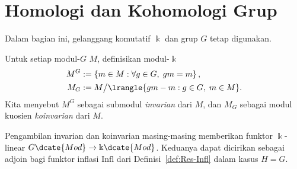 
\section{Homologi dan Kohomologi Grup}\label{sec:group-coh-sub}
\hypertarget{o014.aljabr2.chapter6.group-homology-cohomology}{ }
Dalam bagian ini, gelanggang komutatif $\Bbbk$ dan grup $G$ tetap digunakan.

\begin{definisi}
	Untuk setiap modul-$G$ $M$, definisikan modul-$\Bbbk$
	\begin{align*}
		M^G & := \left\{ m \in M : \forall g \in G, \; gm = m \right\}, \\
		M_G & := M \big/ \lrangle{gm - m : g \in G, \; m \in M}.
	\end{align*}
	Kita menyebut $M^G$ sebagai submodul \emph{invarian} dari $M$, dan $M_G$
	sebagai modul kuosien \emph{koinvarian} dari $M$.
\end{definisi}

Pengambilan invarian dan koinvarian masing-masing memberikan funktor
$\Bbbk$-linear $G\dcate{Mod}\to\Bbbk\dcate{Mod}$. Keduanya dapat dicirikan
sebagai adjoin bagi funktor inflasi $\mathrm{Infl}$ dari
Definisi~\ref{def:Res-Infl} dalam kasus $H=G$.

